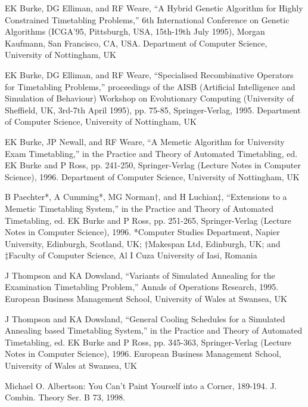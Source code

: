 \begin{thebibliography}{99}
EK Burke, DG Elliman, and RF Weare, “A Hybrid Genetic Algorithm for Highly Constrained Timetabling Problems,” 6th International Conference on Genetic Algorithms
(ICGA’95, Pittsburgh, USA, 15th-19th July 1995), Morgan Kaufmann, San Francisco,
CA, USA. Department of Computer Science, University of Nottingham, UK

EK Burke, DG Elliman, and RF Weare, “Specialised Recombinative Operators for Timetabling Problems,” proceedings of the AISB (Artificial Intelligence and Simulation
of Behaviour) Workshop on Evolutionary Computing (University of Sheffield, UK, 3rd-7th
April 1995), pp. 75-85, Springer-Verlag, 1995. Department of Computer Science,
University of Nottingham, UK

EK Burke, JP Newall, and RF Weare, “A Memetic Algorithm for University Exam
Timetabling,” in the Practice and Theory of Automated Timetabling, ed. EK Burke and
P Ross, pp. 241-250, Springer-Verlag (Lecture Notes in Computer Science), 1996.
Department of Computer Science, University of Nottingham, UK

B Paechter*, A Cumming*, MG Norman†, and H Luchian‡, “Extensions to a Memetic Timetabling System,” in the Practice and Theory of Automated Timetabling,
ed. EK Burke and P Ross, pp. 251-265, Springer-Verlag (Lecture Notes in Computer
Science), 1996. *Computer Studies Department, Napier University, Edinburgh,
Scotland, UK; †Makespan Ltd, Edinburgh, UK; and ‡Faculty of Computer Science,
Al I Cuza University of Iasi, Romania

J Thompson and KA Dowsland, “Variants of Simulated Annealing for the Examination
Timetabling Problem,” Annals of Operations Research, 1995. European Business
Management School, University of Wales at Swansea, UK

J Thompson and KA Dowsland, “General Cooling Schedules for a Simulated
Annealing based Timetabling System,” in the Practice and Theory of Automated Timetabling,
ed. EK Burke and P Ross, pp. 345-363, Springer-Verlag (Lecture Notes in Computer Science), 1996. European Business Management School, University of Wales at Swansea, UK

Michael O. Albertson: You Can't Paint Yourself into a Corner, 189-194. J. Combin. Theory Ser. B 73, 1998.


\end{thebibliography}
